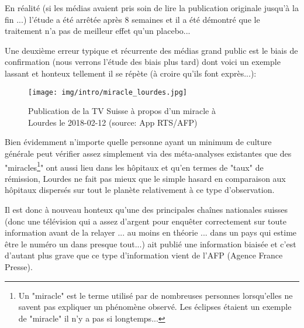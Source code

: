 	En réalité (si les médias avaient pris soin de lire la publication originale jusqu'à la fin ...) l'étude a été arrêtée après $8$ semaines et il a été démontré que le traitement n'a pas de meilleur effet qu'un placebo...
	
	Une deuxième erreur typique et récurrente des médias grand public est le biais de confirmation (nous verrons l'étude des biais plus tard) dont voici un exemple lassant et honteux tellement il se répète (à croire qu'ils font exprès...):
	\begin{figure}[H]
		\centering
		\texttt{[image: img/intro/miracle\_lourdes.jpg]}
		\caption[Publication de la Télévision Suisse sur un miracle à Lourdes]{Publication de la TV Suisse à propos d'un miracle à\\ Lourdes le 2018-02-12 (source: App RTS/AFP)}
	\end{figure}
	Bien évidemment n'importe quelle personne ayant un minimum de culture générale peut vérifier assez simplement via des méta-analyses existantes que des "miracles\footnote{Un "miracle" est le terme utilisé par de nombreuses personnes lorsqu'elles ne savent pas expliquer un phénomène observé. Les éclipses étaient un exemple de "miracle" il n'y a pas si longtemps...}" ont aussi lieu dans les hôpitaux et qu'en termes de "taux" de rémission, Lourdes ne fait pas mieux que le simple hasard en comparaison aux hôpitaux dispersés sur tout le planète relativement à ce type d'observation.
	
	Il est donc à nouveau honteux qu'une des principales chaînes nationales suisses (donc une télévision qui a assez d'argent pour enquêter correctement sur toute information avant de la relayer ... au moins en théorie ... dans un pays qui estime être le numéro un dans presque tout...) ait publié une information biaisée et c'est d'autant plus grave que ce type d'information vient de l'AFP (Agence France Presse).

